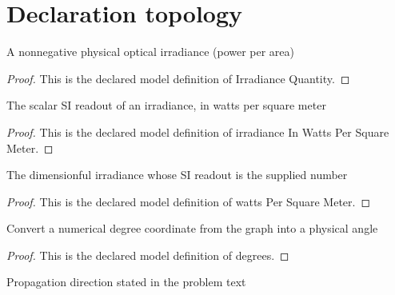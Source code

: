 \section{Declaration topology}
\begin{definition}
  \label{def:physics:phyx-mini-0105:phyxminiproblems-problemphyxmini0105-irradiancequantity}
  A nonnegative physical optical irradiance (power per area)
\end{definition}
\begin{proof}
  This is the declared model definition of Irradiance Quantity.
\end{proof}
\begin{definition}
  \label{def:physics:phyx-mini-0105:phyxminiproblems-problemphyxmini0105-irradianceinwattspersquaremeter}
  The scalar SI readout of an irradiance, in watts per square meter
\end{definition}
\begin{proof}
  This is the declared model definition of irradiance In Watts Per Square Meter.
\end{proof}
\begin{definition}
  \label{def:physics:phyx-mini-0105:phyxminiproblems-problemphyxmini0105-wattspersquaremeter}
  The dimensionful irradiance whose SI readout is the supplied number
\end{definition}
\begin{proof}
  This is the declared model definition of watts Per Square Meter.
\end{proof}
\begin{definition}[degrees]
  \label{def:physics:phyx-mini-0105:phyxminiproblems-problemphyxmini0105-degrees}
  Convert a numerical degree coordinate from the graph into a physical angle
\end{definition}
\begin{proof}
  This is the declared model definition of degrees.
\end{proof}
\begin{definition}
  \label{def:physics:phyx-mini-0105:phyxminiproblems-problemphyxmini0105-propagationdirection}
  Propagation direction stated in the problem text
\end{definition}
